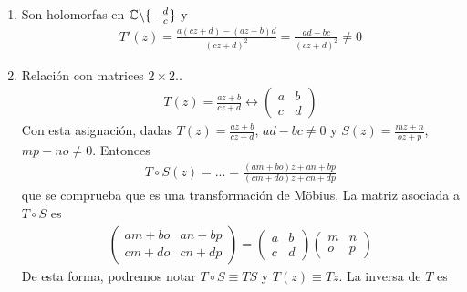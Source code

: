 \begin{enumerate}
    \item Son holomorfas en $\mathbb{C} \backslash \{ - \frac{d}{c}\}$ y
          \begin{align*}
              T'(z) = \frac{a(cz + d) - (az + b)d}{(cz+d)^2} = \frac{ad - bc}{(cz + d)^2}  \not = 0
          \end{align*}
    \item Relación con matrices $2 \times 2$..
          \begin{align*}
              T(z) = \frac{az + b}{cz + d} \longleftrightarrow \begin{pmatrix}
                                                                   a & b \\
                                                                   c & d
                                                               \end{pmatrix}
          \end{align*}
          Con esta asignación, dadas $T(z) = \frac{az + b}{cz + d}$, $ad - bc \not = 0$ y $S(z) = \frac{mz + n}{oz + p}$, $mp - no \not = 0$. Entonces
          \begin{align*}
              T \circ S (z) = ... = \frac{(am + bo)z + an + bp}{(cm + do)z + cn + dp}
          \end{align*}
          que se comprueba que es una transformación de M\"obius. La matriz asociada a $T \circ S$ es
          \begin{align*}
              \begin{pmatrix}
                  am + bo & an + bp \\
                  cm + do & cn + dp
              \end{pmatrix} = \begin{pmatrix}
                                  a & b \\
                                  c & d
                              \end{pmatrix} \begin{pmatrix}
                                                m & n \\
                                                o & p
                                            \end{pmatrix}
          \end{align*}
          De esta forma, podremos notar $T \circ S \equiv TS$ y $T(z) \equiv Tz$. La inversa de $T$ es
          \begin{align*}

\end{align*}
\end{enumerate}

